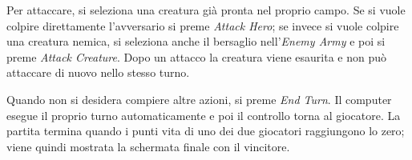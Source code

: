 Per attaccare, si seleziona una creatura già pronta nel proprio campo. Se si
vuole colpire direttamente l'avversario si preme \textit{Attack Hero}; se
invece si vuole colpire una creatura nemica, si seleziona anche il bersaglio
nell'\textit{Enemy Army} e poi si preme \textit{Attack Creature}. Dopo un
attacco la creatura viene esaurita e non può attaccare di nuovo nello stesso
turno.

Quando non si desidera compiere altre azioni, si preme \textit{End Turn}. Il
computer esegue il proprio turno automaticamente e poi il controllo torna al
giocatore. La partita termina quando i punti vita di uno dei due giocatori
raggiungono lo zero; viene quindi mostrata la schermata finale con il vincitore.
